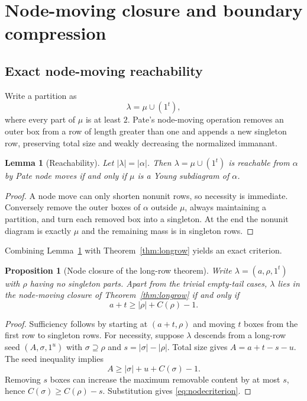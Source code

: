 \documentclass[11pt]{article}
\newtheorem{proposition}[theorem]{Proposition}
\newtheorem{lemma}[theorem]{Lemma}
\theoremstyle{definition}
\begin{document}
\section{Node-moving closure and boundary compression}\label{sec:structure}
\subsection{Exact node-moving reachability}
Write a partition as
\[
 \lambda=\mu\cup(1^t),
\]
where every part of $\mu$ is at least $2$.  Pate's node-moving operation removes an outer box from a row of length greater than one and appends a new singleton row, preserving total size and weakly decreasing the normalized immanant.

\begin{lemma}[Reachability]\label{lem:reach}
Let $|\lambda|=|\alpha|$.  Then $\lambda=\mu\cup(1^t)$ is reachable from $\alpha$ by Pate node moves if and only if $\mu$ is a Young subdiagram of $\alpha$.
\end{lemma}
\begin{proof}
A node move can only shorten nonunit rows, so necessity is immediate.  Conversely remove the outer boxes of $\alpha$ outside $\mu$, always maintaining a partition, and turn each removed box into a singleton.  At the end the nonunit diagram is exactly $\mu$ and the remaining mass is in singleton rows.
\end{proof}

Combining Lemma~\ref{lem:reach} with Theorem~\ref{thm:longrow} yields an exact criterion.

\begin{proposition}[Node closure of the long-row theorem]\label{prop:nodeclosure}
Write $\lambda=(a,\rho,1^t)$ with $\rho$ having no singleton parts.  Apart from the trivial empty-tail cases, $\lambda$ lies in the node-moving closure of Theorem~\ref{thm:longrow} if and only if
\begin{equation}\label{eq:nodecriterion}
 a+t\ge |\rho|+C(\rho)-1.
\end{equation}
\end{proposition}
\begin{proof}
Sufficiency follows by starting at $(a+t,\rho)$ and moving $t$ boxes from the first row to singleton rows.  For necessity, suppose $\lambda$ descends from a long-row seed $(A,\sigma,1^u)$ with $\sigma\supseteq\rho$ and $s=|\sigma|-|\rho|$.  Total size gives $A=a+t-s-u$.  The seed inequality implies
\[
 A\ge |\sigma|+u+C(\sigma)-1.
\]
Removing $s$ boxes can increase the maximum removable content by at most $s$, hence $C(\sigma)\ge C(\rho)-s$.  Substitution gives \eqref{eq:nodecriterion}.
\end{proof}
\end{document}

